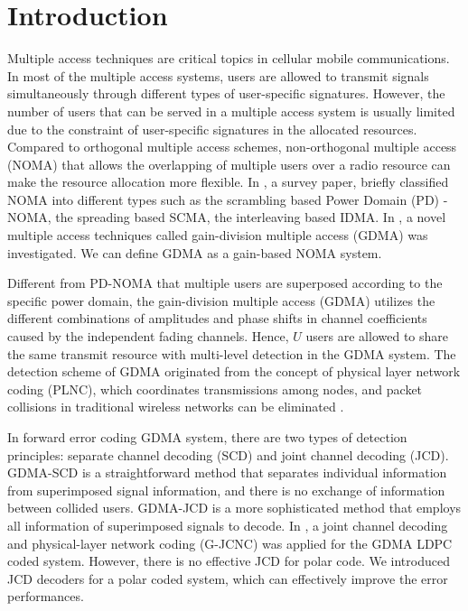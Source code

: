 \chapter{Introduction}
\label{c:intro}

Multiple access techniques are critical topics in cellular mobile communications. In most of the multiple access systems, users are allowed to transmit signals simultaneously through different types of user-specific signatures. However, the number of users that can be served in a multiple access system is usually limited due to the constraint of user-specific signatures in the allocated resources.  Compared to orthogonal multiple access schemes, non-orthogonal multiple access (NOMA)\cite{shahab2019grant} that allows the overlapping of multiple users over a radio resource can make the resource allocation more flexible.  In \cite{shahab2019grant}, a survey paper, briefly classified NOMA into different types such as the scrambling based Power Domain (PD)
-NOMA, the spreading based SCMA, the interleaving based IDMA.  In \cite{bh18}, a novel multiple access techniques called gain-division multiple access (GDMA) was investigated.  We can define GDMA as a gain-based NOMA system.

Different from PD-NOMA that multiple users are superposed according to the specific power domain, the gain-division multiple access (GDMA) utilizes the different combinations of amplitudes and phase shifts in channel coefficients caused by the independent fading channels. Hence, $U$ users are allowed to share the same transmit resource with multi-level detection in the GDMA system. The detection scheme of GDMA originated from the concept of physical layer network coding (PLNC), which coordinates transmissions among nodes, and packet collisions in traditional wireless networks can be eliminated \cite{plnc06}. 

In forward error coding GDMA system, there are two types of detection principles: separate channel decoding (SCD) and joint channel decoding (JCD). GDMA-SCD is a straightforward method that separates individual information from superimposed signal information, and there is no exchange of information between collided users. GDMA-JCD is a more sophisticated method that employs all information of superimposed signals to decode. In \cite{yt19}, a joint channel decoding and physical-layer network coding (G-JCNC)\cite{gjcnc10} was applied for the GDMA LDPC coded system. However, there is no effective JCD for polar code. We introduced JCD decoders for a polar coded system, which can effectively improve the error performances. 

